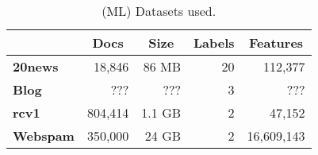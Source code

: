\begin{table}[t]
\centering
{\small
\begin{tabular}{|l|r|r|r|r|}
    \hline
    & \multicolumn{1}{c|}{\textbf{Docs}}
    & \multicolumn{1}{c|}{\textbf{Size}}
    & \multicolumn{1}{c|}{\textbf{Labels}}
    & \multicolumn{1}{c|}{\textbf{Features}}\\
    \hline
    \textbf{20news}  & 18,846     & 86 MB  & 20 & 112,377 \\
    \textbf{Blog}    & ???        & ???    & 3  & ??? \\
    \textbf{rcv1}    & 804,414    & 1.1 GB & 2  & 47,152 \\
    \textbf{Webspam} & 350,000    & 24 GB  & 2  & 16,609,143 \\
    \hline
\end{tabular}
}
\caption{(ML) Datasets used.}
\label{table:ml-datasets}
\end{table}
